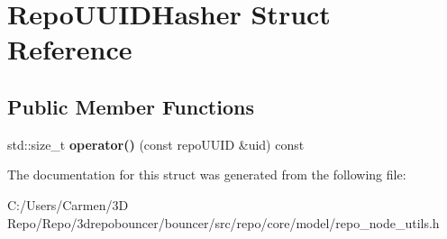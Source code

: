 \hypertarget{struct_repo_u_u_i_d_hasher}{}\section{Repo\+U\+U\+I\+D\+Hasher Struct Reference}
\label{struct_repo_u_u_i_d_hasher}
\subsection*{Public Member Functions}
\begin{DoxyCompactItemize}
\item 
\hypertarget{struct_repo_u_u_i_d_hasher_aa4e7aa4aa72ee3d873a30d5d039bb5f4}{}std\+::size\+\_\+t {\bfseries operator()} (const repo\+U\+U\+I\+D \&uid) const \label{struct_repo_u_u_i_d_hasher_aa4e7aa4aa72ee3d873a30d5d039bb5f4}

\end{DoxyCompactItemize}


The documentation for this struct was generated from the following file\+:\begin{DoxyCompactItemize}
\item 
C\+:/\+Users/\+Carmen/3\+D Repo/\+Repo/3drepobouncer/bouncer/src/repo/core/model/repo\+\_\+node\+\_\+utils.\+h\end{DoxyCompactItemize}
